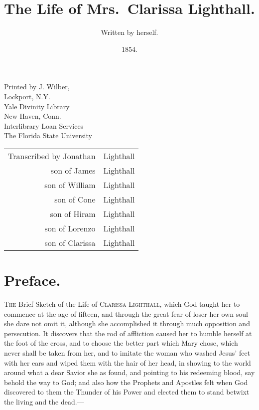 \documentclass{article}
\title{The Life of Mrs.\ Clarissa Lighthall.}
\author{Written by herself.}
\date{1854.}
\begin{document}
\maketitle

\noindent Printed by J. Wilber,\\
Lockport, N.Y.\\

\noindent %
Yale Divinity Library\\
New Haven, Conn.\\

\noindent %
Interlibrary Loan Services\\
The Florida State University\\

\begin{tabular}{r@{ }l}
Transcribed by Jonathan &Lighthall\\
son of James &Lighthall\\
son of William &Lighthall\\
son of Cone &Lighthall\\
son of Hiram &Lighthall\\
son of Lorenzo &Lighthall\\
son of Clarissa &Lighthall\\
\end{tabular}

\section*{Preface.}
\textsc{The} Brief Sketch of the Life of \textsc{Clarissa Lighthall}, which God taught her to commence
at the age of fifteen, and through the great fear of loser her own soul she dare not omit it,
although she accomplished it through much opposition and persecution. It discovers that the
rod of affliction caused her to humble herself at the foot of the cross, and to choose the better
part which Mary chose, which never shall be taken from her, and to imitate the woman who
washed Jesus' feet with her ears and wiped them with the hair of her head, in showing to
the world around what a dear Savior she as found, and pointing to his redeeming blood, say
behold the way to God; and also how the Prophets and Apostles felt when God discovered to
them the Thunder of his Power and elected them to stand betwixt the living and the dead.---
\end{document}
